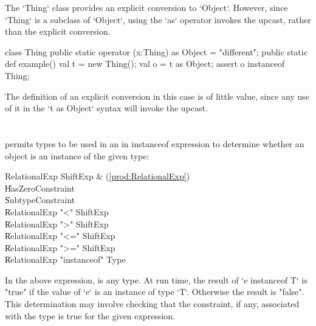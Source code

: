 \begin{ex}
The \xcd`Thing` class provides an explicit conversion to \xcd`Object`.
However, since \xcd`Thing` is a subclass of \xcd`Object`, 
using the \xcd`as` operator invokes the upcast, rather than the explicit
conversion.  
\begin{xten}
class Thing {
  public static operator (x:Thing) as Object = "different";
  public static def example() {
    val t = new Thing();
    val o = t as Object;
    assert o instanceof Thing;
  }
}
\end{xten}
The definition of an explicit conversion in this case is of little value,
since any use of it in the \xcd`t as Object` syntax will invoke the upcast.  
\end{ex}

\section{}
\label{instanceOf}

\Xten{} permits types to be used in an in instanceof expression
to determine whether an object is an instance of the given type:

\begin{bbgrammar}
       RelationalExp \: ShiftExp & (\ref{prod:RelationalExp}) \\
                    \| HasZeroConstraint \\
                    \| SubtypeConstraint \\
                    \| RelationalExp \xcd"<" ShiftExp \\
                    \| RelationalExp \xcd">" ShiftExp \\
                    \| RelationalExp \xcd"<=" ShiftExp \\
                    \| RelationalExp \xcd">=" ShiftExp \\
                    \| RelationalExp \xcd"instanceof" Type \\
\end{bbgrammar}

In the above expression,  is any type. At run time, the
result of \xcd`e instanceof T`
is \xcd"true" if the
value of \xcd`e` is an instance of type \xcd`T`.
Otherwise the result is \xcd"false". This determination may involve checking
that the constraint, if any, associated with the type is true for the given
expression.

